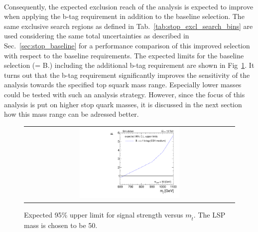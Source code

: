 \\
Consequently, the expected exclusion reach of the analysis is expected to improve when applying the b-tag requirement in addition to the baseline selection. The same exclusive search regions as defined in Tab.~\ref{tab:stop_excl_search_bins} are used considering the same total uncertainties as described in Sec.~\ref{sec:stop_baseline} for a performance comparison of this improved selection with respect to the baseline requirements. The expected limits for the baseline selection (= B.) including the additional b-tag requirement are shown in Fig~\ref{fig:stop_baselinebtag_limit}. It turns out that the b-tag requirement significantly improves the sensitivity of the analysis towards the specified top squark mass range. Especially lower masses could be tested with such an analysis strategy. However, since the focus of this analysis is put on higher stop quark masses, it is discussed in the next section how this mass range can be adressed better.  
\begin{figure}[!h]
  \centering
  \begin{tabular}{c}
                \includegraphics[width=0.49\textwidth]{figures/limitplot4BinSel_BaselineBTag_LSP50.pdf} 
  \end{tabular}
  \caption{Expected 95\% upper limit for signal strength versus $m_{\tilde{t}}$. The LSP mass is chosen to be 50\gev.}
  \label{fig:stop_baselinebtag_limit}
\end{figure}

